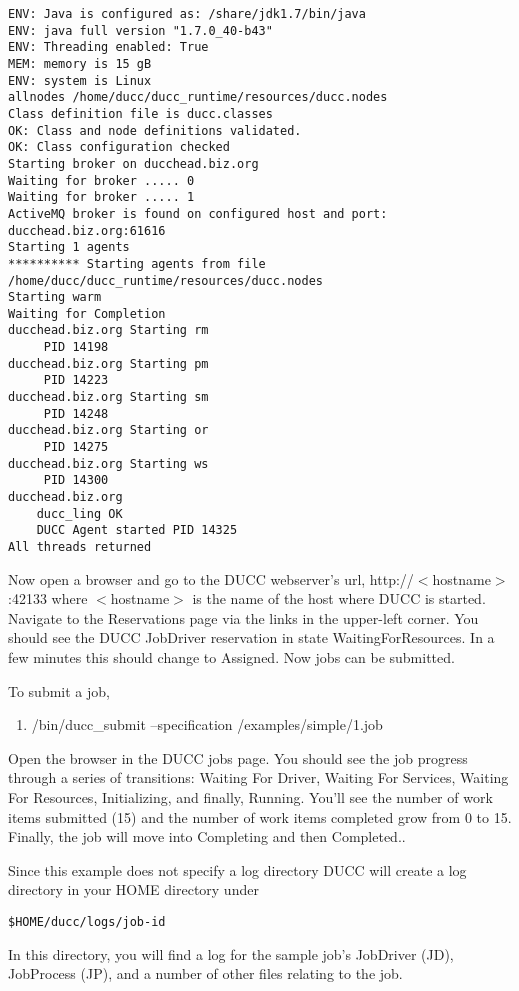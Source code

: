 \begin{verbatim}
ENV: Java is configured as: /share/jdk1.7/bin/java
ENV: java full version "1.7.0_40-b43"
ENV: Threading enabled: True
MEM: memory is 15 gB
ENV: system is Linux
allnodes /home/ducc/ducc_runtime/resources/ducc.nodes
Class definition file is ducc.classes
OK: Class and node definitions validated.
OK: Class configuration checked
Starting broker on ducchead.biz.org
Waiting for broker ..... 0
Waiting for broker ..... 1
ActiveMQ broker is found on configured host and port: ducchead.biz.org:61616
Starting 1 agents
********** Starting agents from file /home/ducc/ducc_runtime/resources/ducc.nodes
Starting warm
Waiting for Completion
ducchead.biz.org Starting rm
     PID 14198
ducchead.biz.org Starting pm
     PID 14223
ducchead.biz.org Starting sm
     PID 14248
ducchead.biz.org Starting or
     PID 14275
ducchead.biz.org Starting ws
     PID 14300
ducchead.biz.org
    ducc_ling OK
    DUCC Agent started PID 14325
All threads returned
\end{verbatim}

  Now open a browser and go to the DUCC webserver's url, http://$<$hostname$>$:42133 where $<$hostname$>$ is
  the name of the host where DUCC is started.  Navigate to the Reservations page via the links in
  the upper-left corner.  You should see the DUCC JobDriver reservation in state
  WaitingForResources.  In a few minutes this should change to Assigned.
  Now jobs can be submitted.
  
  To submit a job,
  \begin{enumerate}
    \item \duccruntime/bin/ducc\_submit --specification \duccruntime/examples/simple/1.job
    \end{enumerate}
    
    Open the browser in the DUCC jobs page.  You should see the job progress through a series of
    transitions: Waiting For Driver, Waiting For Services, Waiting For Resources, Initializing, and
    finally, Running.  You'll see the number of work items submitted (15) and the number of work
    items completed grow from 0 to 15.  Finally, the job will move into Completing and then
    Completed..

    Since this example does not specify a log directory DUCC will create a log directory in your HOME directory under 
\begin{verbatim}
$HOME/ducc/logs/job-id
\end{verbatim}

    In this directory, you will find a log for the sample job's JobDriver (JD), JobProcess (JP), and
    a number of other files relating to the job.

